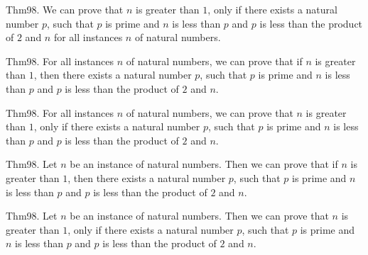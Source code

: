 \documentclass{article}
\begin{document}
Thm98. We can prove that $n$ is greater than $1$, only if there exists a natural number $p$, such that $p$ is prime and $n$ is less than $p$ and $p$ is less than the product of $2$ and $n$ for all instances $n$ of natural numbers.

Thm98. For all instances $n$ of natural numbers, we can prove that if $n$ is greater than $1$, then there exists a natural number $p$, such that $p$ is prime and $n$ is less than $p$ and $p$ is less than the product of $2$ and $n$.

Thm98. For all instances $n$ of natural numbers, we can prove that $n$ is greater than $1$, only if there exists a natural number $p$, such that $p$ is prime and $n$ is less than $p$ and $p$ is less than the product of $2$ and $n$.

Thm98. Let $n$ be an instance of natural numbers. Then we can prove that if $n$ is greater than $1$, then there exists a natural number $p$, such that $p$ is prime and $n$ is less than $p$ and $p$ is less than the product of $2$ and $n$.

Thm98. Let $n$ be an instance of natural numbers. Then we can prove that $n$ is greater than $1$, only if there exists a natural number $p$, such that $p$ is prime and $n$ is less than $p$ and $p$ is less than the product of $2$ and $n$.
\end{document}
